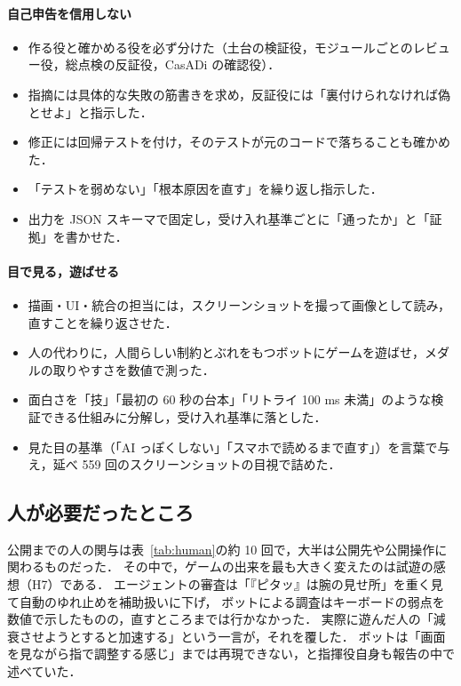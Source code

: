 \documentclass[a4paper,10pt]{ltjsarticle}
\newcommand{\tabref}[1]{表~\ref{#1}}
\begin{document}
\paragraph{自己申告を信用しない}
\begin{itemize}
  \item 作る役と確かめる役を必ず分けた（土台の検証役，モジュールごとのレビュー役，総点検の反証役，CasADi の確認役）．
  \item 指摘には具体的な失敗の筋書きを求め，反証役には「裏付けられなければ偽とせよ」と指示した．
  \item 修正には回帰テストを付け，そのテストが元のコードで落ちることも確かめた．
  \item 「テストを弱めない」「根本原因を直す」を繰り返し指示した．
  \item 出力を JSON スキーマで固定し，受け入れ基準ごとに「通ったか」と「証拠」を書かせた．
\end{itemize}

\paragraph{目で見る，遊ばせる}
\begin{itemize}
  \item 描画・UI・統合の担当には，スクリーンショットを撮って画像として読み，直すことを繰り返させた．
  \item 人の代わりに，人間らしい制約とぶれをもつボットにゲームを遊ばせ，メダルの取りやすさを数値で測った．
  \item 面白さを「技」「最初の 60 秒の台本」「リトライ 100 ms 未満」のような検証できる仕組みに分解し，受け入れ基準に落とした．
  \item 見た目の基準（「AI っぽくしない」「スマホで読めるまで直す」）を言葉で与え，延べ 559 回のスクリーンショットの目視で詰めた．
\end{itemize}

\subsection{人が必要だったところ}
公開までの人の関与は\tabref{tab:human}の約 10 回で，大半は公開先や公開操作に関わるものだった．
その中で，ゲームの出来を最も大きく変えたのは試遊の感想（H7）である．
エージェントの審査は「『ピタッ』は腕の見せ所」を重く見て自動のゆれ止めを補助扱いに下げ，
ボットによる調査はキーボードの弱点を数値で示したものの，直すところまでは行かなかった．
実際に遊んだ人の「減衰させようとすると加速する」という一言が，それを覆した．
ボットは「画面を見ながら指で調整する感じ」までは再現できない，と指揮役自身も報告の中で述べていた．
\end{document}
